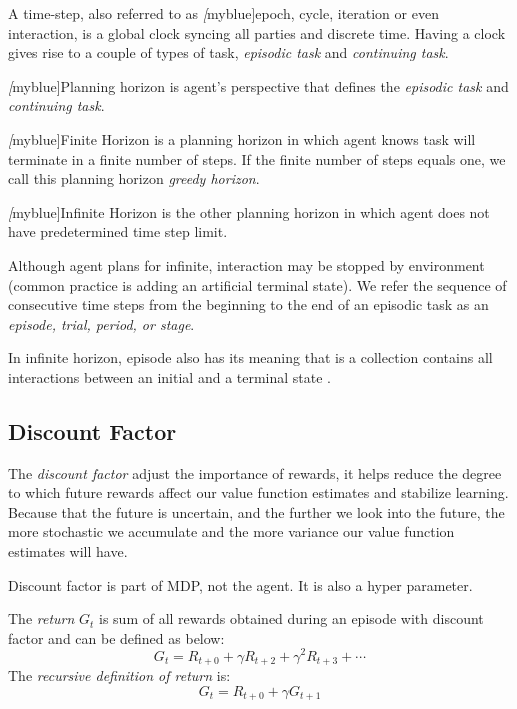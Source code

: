     A time-step, also referred to as \emph[myblue]{epoch, cycle, iteration or even interaction,} is a global clock syncing
    all parties and discrete time. Having a clock gives rise to a couple of types of task, {\itshape episodic task} and
      {\itshape continuing task}. \par \emph[myblue]{Planning horizon} is agent's perspective that defines the {\itshape
        episodic task} and {\itshape continuing task}.

    \emph[myblue]{Finite Horizon} is a planning horizon in which agent knows task will terminate in a finite number of
    steps. If the finite number of steps equals one, we call this planning horizon {\itshape greedy horizon}.\par
    \emph[myblue]{Infinite Horizon} is the other planning horizon in which agent does not have predetermined time step
    limit.\par Although agent plans for infinite, interaction may be stopped by environment (common practice is adding an
    artificial terminal state). We refer the sequence of consecutive time steps from the beginning to the end of an episodic
    task as an \emph{episode, trial, period, or stage}.\par In
    infinite horizon, episode also has its meaning that is a collection contains all interactions between an initial and a
    terminal state .

  \subsection{Discount Factor}

    The \emph{discount factor} adjust the importance of rewards, it helps reduce the degree to which future rewards affect
    our value function estimates and stabilize learning. Because that the future is uncertain, and the further we look into
    the future, the more stochastic we accumulate and the more variance our value function estimates will have. \par

    Discount factor is part of MDP, not the agent. It is also a hyper parameter.

    The \emph{return} $G_t$ is sum of all rewards obtained during an episode with discount factor and can be defined as
    below:
    \begin{equation}
      G_t=R_{t+0}+ \gamma R_{t+2} + \gamma^2 R_{t+3} + \cdots
    \end{equation}
    The \emph{recursive definition of return} is:
    \begin{equation}
      G_t = R_{t+0}+\gamma G_{t+1}
    \end{equation}
